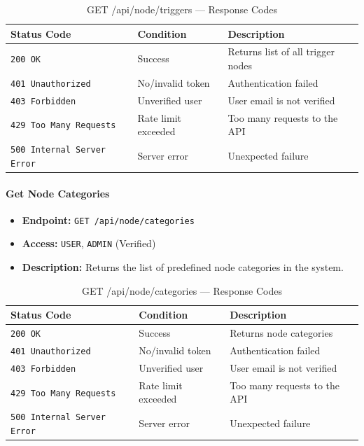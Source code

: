 \begin{table}[H]
\centering
\renewcommand{\arraystretch}{1.3}
\begin{tabularx}{\textwidth}{|l|l|X|}
\hline
\textbf{Status Code} & \textbf{Condition} & \textbf{Description} \\
\hline
\texttt{200 OK}           & Success      & Returns list of all trigger nodes \\
\hline
\texttt{401 Unauthorized} & No/invalid token & Authentication failed \\
\hline
\texttt{403 Forbidden}    & Unverified user  & User email is not verified \\
\hline
\texttt{429 Too Many Requests} & Rate limit exceeded & Too many requests to the API \\
\hline
\texttt{500 Internal Server Error} & Server error & Unexpected failure \\
\hline
\end{tabularx}
\caption{GET /api/node/triggers — Response Codes}
\label{tab:get-trigger-nodes-responses}
\end{table}
\FloatBarrier

\paragraph{Get Node Categories}
\label{subsubsec:get-node-categories}

\begin{itemize}
  \item \textbf{Endpoint:} \texttt{GET /api/node/categories}
  \item \textbf{Access:} \texttt{USER}, \texttt{ADMIN} (Verified)
  \item \textbf{Description:} Returns the list of predefined node categories in the system.
\end{itemize}

\begin{table}[H]
\centering
\renewcommand{\arraystretch}{1.3}
\begin{tabularx}{\textwidth}{|l|l|X|}
\hline
\textbf{Status Code} & \textbf{Condition} & \textbf{Description} \\
\hline
\texttt{200 OK}           & Success      & Returns node categories \\
\hline
\texttt{401 Unauthorized} & No/invalid token & Authentication failed \\
\hline
\texttt{403 Forbidden}    & Unverified user  & User email is not verified \\
\hline
\texttt{429 Too Many Requests} & Rate limit exceeded & Too many requests to the API \\
\hline
\texttt{500 Internal Server Error} & Server error & Unexpected failure \\
\hline
\end{tabularx}
\caption{GET /api/node/categories — Response Codes}
\label{tab:get-node-categories-responses}
\end{table}
\FloatBarrier

